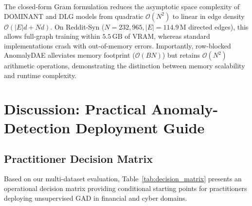 \documentclass[applsci,article,submit,moreauthors,pdftex]{Definitions/mdpi}
\begin{document}
The closed-form Gram formulation reduces the asymptotic space complexity of DOMINANT and DLG models from quadratic $\mathcal{O}(N^2)$ to linear in edge density $\mathcal{O}(|E| d + N d)$. On Reddit-Syn ($N=232,965, |E|=114.9\,\mathrm{M}$ directed edges), this allows full-graph training within $5.5\,\mathrm{GB}$ of VRAM, whereas standard implementations crash with out-of-memory errors. Importantly, row-blocked AnomalyDAE alleviates memory footprint ($\mathcal{O}(B N)$) but retains $\mathcal{O}(N^2)$ arithmetic operations, demonstrating the distinction between memory scalability and runtime complexity.

\section{Discussion: Practical Anomaly-Detection Deployment Guide}
\label{sec:discussion}

\subsection{Practitioner Decision Matrix}
Based on our multi-dataset evaluation, Table~\ref{tab:decision_matrix} presents an operational decision matrix providing conditional starting points for practitioners deploying unsupervised GAD in financial and cyber domains.
\end{document}
